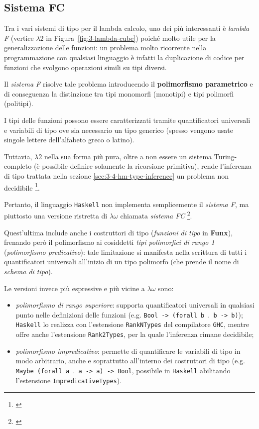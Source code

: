 \subsection{Sistema FC}
\label{sec:3-3-system-fc}

Tra i vari sistemi di tipo per il lambda calcolo, uno dei più interessanti è \textit{lambda F}
(vertice $\lambda2$ in Figura~\ref{fig:3-lambda-cube}) poiché molto utile per la generalizzazione delle funzioni:
un problema molto ricorrente nella programmazione con qualsiasi linguaggio è infatti la duplicazione di codice
per funzioni che svolgono operazioni simili su tipi diversi.


Il \textit{sistema F} risolve tale problema introducendo il \textbf{polimorfismo parametrico}
e di conseguenza la distinzione tra tipi monomorfi (monotipi) e tipi polimorfi (politipi).

\noindent I tipi delle funzioni possono essere caratterizzati tramite quantificatori universali e variabili di tipo
ove sia necessario un tipo generico (spesso vengono usate singole lettere dell'alfabeto greco o latino).


Tuttavia, $\lambda2$ nella sua forma più pura, oltre a non essere un sistema Turing-completo
(è possibile definire solamente la ricorsione primitiva), rende l'inferenza di tipo trattata nella sezione
\ref{sec:3-4-hm-type-inference} un problema non decidibile%
\footnote{ \cite{Wells-1999-TypabilityUndecidable}}.

\noindent Pertanto, il linguaggio \texttt{Haskell} non implementa semplicemente il \textit{sistema F},
ma piuttosto una versione ristretta di $\lambda\omega$ chiamata \textit{sistema FC}%
\footnote{ \cite{Eisenberg-2015-SystemFC}}.

\noindent Quest'ultima include anche i costruttori di tipo (\textit{funzioni di tipo} in \textbf{Funx}),
frenando però il polimorfismo ai cosiddetti \textit{tipi polimorfici di rango 1} (\textit{polimorfismo predicativo}):
tale limitazione si manifesta nella scrittura di tutti i quantificatori universali all'inizio di un tipo polimorfo
(che prende il nome di \textit{schema di tipo}).

\noindent Le versioni invece più espressive e più vicine a $\lambda\omega$ sono:
\begin{itemize}
    \item \textit{polimorfismo di rango superiore}: supporta quantificatori universali in qualsiasi punto
          nelle definizioni delle funzioni (e.g. \texttt{Bool -> (forall b $\mathord{.}$ b -> b)});
          \texttt{Haskell} lo realizza con l'estensione \texttt{RankNTypes} del compilatore \texttt{GHC},
          mentre offre anche l'estensione \texttt{Rank2Types}, per la quale l'inferenza rimane decidibile;
    \item \textit{polimorfismo impredicativo}: permette di quantificare le variabili di tipo in modo arbitrario,
          anche e soprattutto all'interno dei costruttori di tipo (e.g. \texttt{Maybe (forall a $\mathord{.}$ a -> a) -> Bool},
          possibile in \texttt{Haskell} abilitando l'estensione \texttt{ImpredicativeTypes}).
\end{itemize}

